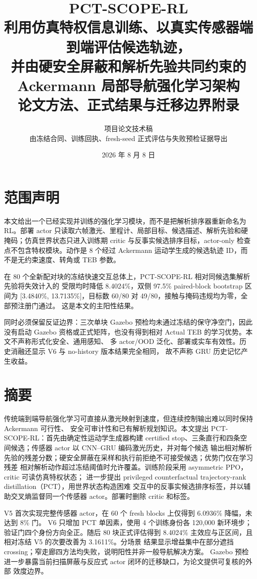 \documentclass[12pt,a4paper,oneside]{report}
\title{\Huge PCT-SCOPE-RL\\[0.35em]
\Large 利用仿真特权信息训练、以真实传感器端到端评估候选轨迹，\\
并由硬安全屏蔽和解析先验共同约束的 Ackermann 局部导航强化学习架构\\[0.8em]
\large 论文方法、正式结果与迁移边界附录}
\author{项目论文技术稿\\\small 由冻结合同、训练回执、fresh-seed 正式评估与失败预检证据导出}
\date{2026 年 8 月 8 日}
\begin{document}
\maketitle

\chapter*{范围声明}
本文给出一个已经实现并训练的强化学习模块，而不是把解析排序器重新命名为 RL。部署 actor
只读取六帧激光、里程计、局部目标、候选描述、解析先验和硬掩码；仿真世界状态只进入训练期
critic 与反事实候选排序目标，actor-only 检查点不包含特权模块。动作是 8 个经过 Ackermann
运动学生成的候选轨迹 ID，而不是无约束速度、转角或 TEB 参数。

在 80 个全新配对块的冻结快速交互总体上，PCT-SCOPE-RL 相对同候选集解析先验将失效计入的
受限均时降低 8.4024\%，双侧 97.5\% paired-block bootstrap 区间为
[3.4840\%, 13.7135\%]，目标数 60/80 对 49/80，接触与掩码违规均为零，全部预注册门通过。
这是本文的主阳性结果。

同时必须保留反证边界：三次单块 Gazebo 预检均未通过冻结的保守净空门，因此没有启动 Gazebo
资格或正式矩阵，也没有得到相对 Actual TEB 的学习优势。本文不声称形式化安全、通用感知、
多 actor/OOD 泛化、部署或实车有效性。历史消融还显示 V6 与 no-history 版本结果完全相同，
故不声称 GRU 历史记忆产生收益。

\chapter*{摘要}
传统端到端导航强化学习可直接从激光映射到速度，但连续控制输出难以同时保持 Ackermann 可行性、
安全可审计性和已有解析规划知识。本文提出 PCT-SCOPE-RL：首先由确定性运动学生成器构建
certified stop、三条直行和四条空间候选；传感器 actor 以 CNN--GRU 编码激光历史，并对每个候选
输出相对解析先验的残差分数；硬安全屏蔽在采样和执行前拒绝不可接受候选；优势门仅在学习残差
相对解析动作超过冻结阈值时允许覆盖。训练阶段采用 asymmetric PPO，critic 可读仿真特权状态；
进一步提出 privileged counterfactual trajectory-rank distillation（PCT），用世界状态构造困难
交互中的反事实候选排序标签，并以辅助交叉熵监督同一个传感器 actor。部署时删除 critic 和标签。

V5 首次实现完整传感器 actor，在 60 个 fresh blocks 上仅得到 6.0936\% 降幅，未达到 8\% 门。
V6 只增加 PCT 单因素，使用 4 个训练身份各 120,000 新环境步；验证门四个身份方向全正。随后
80 块正式评估得到 8.4024\% 主效应与正区间，且相对冻结 V5 的次要改善为 3.1611\%。分场景
结果显示增益集中在部分遮挡 crossing；窄走廊四方法均失败，说明阳性并非一般导航解决方案。
Gazebo 预检进一步暴露当前扫描屏蔽与反应式 actor 闭环的迁移缺口，为论文提供可复核的外部
效度边界。
\end{document}
